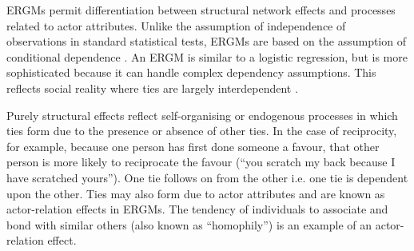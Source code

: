 ERGMs permit differentiation between structural network effects and processes related to actor attributes. Unlike the assumption of independence of observations in standard statistical tests, ERGMs are based on the assumption of conditional dependence \citep{pattison2002neighborhood}. An ERGM is similar to a logistic regression, but is more sophisticated because it can handle complex dependency assumptions. This reflects social reality where ties are largely interdependent \citep{kadushin2012understanding}. \medskip

Purely structural effects reflect self-organising or endogenous processes in which ties form due to the presence or absence of other ties. In the case of reciprocity, for example, because one person has first done someone a favour, that other person is more likely to reciprocate the favour (\enquote{you scratch my back because I have scratched yours}). One tie follows on from the other i.e. one tie is dependent upon the other. Ties may also form due to actor attributes and are known as actor-relation effects in ERGMs. The tendency of individuals to associate and bond with similar others (also known as \enquote{homophily}) is an example of an actor-relation effect. \medskip 

